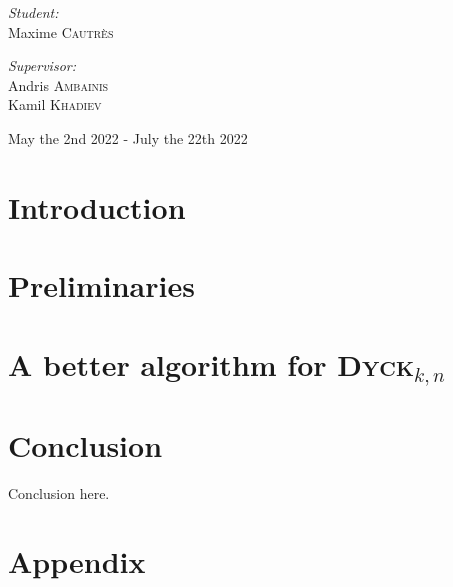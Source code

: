 \documentclass[11pt,a4paper]{article}
\newcommand{\Dyck}[1]{\textsc{Dyck$_{#1}$}}
\theoremstyle{definition}
\theoremstyle{plain}
\theoremstyle{definition}
\begin{document}
\begin{titlepage}
\begin{sffamily}
\begin{center}
            \hspace{-0.8cm}
            \begin{minipage}{0.4\textwidth}
                \begin{flushleft} \large
                    \emph{Student:} \\
                    Maxime \textsc{Cautrès}\\
                \end{flushleft}
            \end{minipage}
            \hspace{3cm}
            \begin{minipage}{0.4\textwidth}
                \begin{flushright} \large
                    \emph{Supervisor:}\\
                    Andris \textsc{Ambainis}\\
                    Kamil \textsc{Khadiev}\\
                \end{flushright}
            \end{minipage}

            \vspace*{0.5cm}
            {\large   May the 2nd 2022 -  July the 22th 2022}
        \end{center}
    \end{sffamily}
\end{titlepage}

\tableofcontents

\newpage

\section{Introduction}



\section{Preliminaries}\label{sec:preli}



\section{A better algorithm for \Dyck{k,n}}
\label{main_section}



\section{Conclusion}

Conclusion here.




\listoffigures
\listofalgorithms

\newpage

\section{Appendix}


\end{document}
